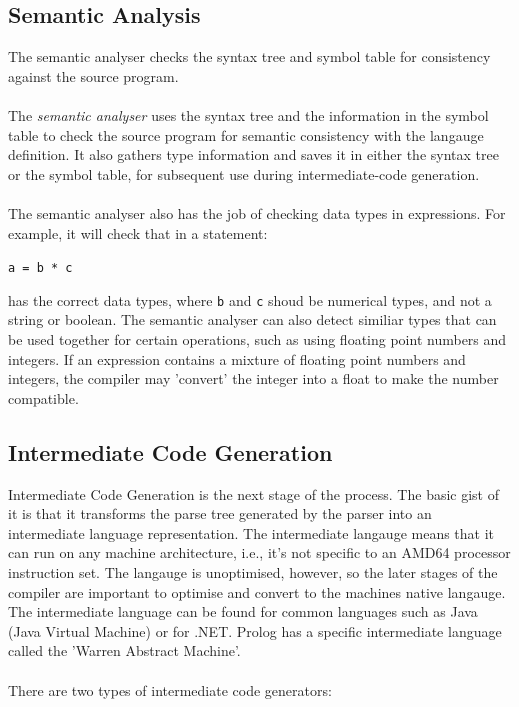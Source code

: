 \documentclass[12pt]{report}
\begin{document}
\subsection{Semantic Analysis}\label{subsec:syntax_trees}
The semantic analyser checks the syntax tree and symbol table for consistency against the source program.\\
\\
The \textit{semantic analyser} uses the syntax tree and the information in the symbol table to check the source program for semantic consistency with the langauge definition.  It also gathers type information and saves it in either the syntax tree or the symbol table, for subsequent use during intermediate-code generation. \citep{compilers07}\\
\\
The semantic analyser also has the job of checking data types in expressions.  For example, it will check that in a statement:
\begin{center}
	\texttt{a = b * c}\\
\end{center}
has the correct data types, where \texttt{b} and \texttt{c} shoud be numerical types, and not a string or boolean.  The semantic analyser can also detect similiar types that can be used together for certain operations, such as using floating point numbers and integers.  If an expression contains a mixture of floating point numbers and integers, the compiler may 'convert' the integer into a float to make the number compatible.
\subsection{Intermediate Code Generation}\label{subsec:intermediate_code_gen}
Intermediate Code Generation is the next stage of the process.  The basic gist of it is that it transforms the parse tree generated by the parser into an intermediate language representation.  The intermediate langauge means that it can run on any machine architecture, i.e., it's not specific to an AMD64 processor instruction set.  The langauge is unoptimised, however, so the later stages of the compiler are important to optimise and convert to the machines native langauge.  The intermediate language can be found for common languages such as Java (Java Virtual Machine) or for .NET.  Prolog has a specific intermediate language called the 'Warren Abstract Machine'.\\
\\
There are two types of intermediate code generators:
\end{document}
